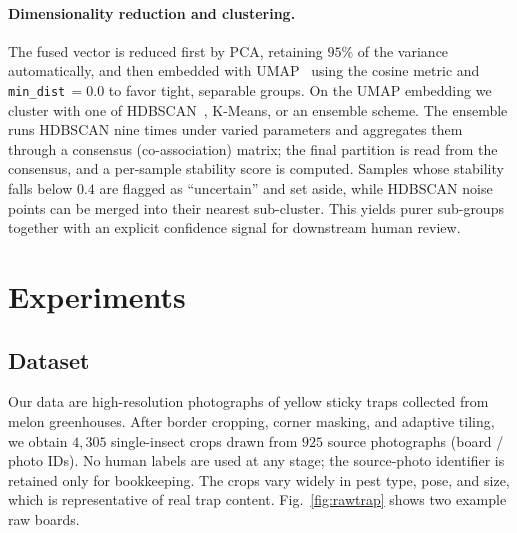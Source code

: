 \documentclass[10pt,a4paper,twocolumn]{article}
\begin{document}
\paragraph{Dimensionality reduction and clustering.}
The fused vector is reduced first by PCA, retaining $95\%$ of the variance automatically, and then embedded with UMAP~\cite{mcinnes2018umap} using the cosine metric and \texttt{min\_dist}\,$=\!0.0$ to favor tight, separable groups. On the UMAP embedding we cluster with one of HDBSCAN~\cite{campello2013hdbscan, mcinnes2017hdbscan}, K-Means, or an ensemble scheme. The ensemble runs HDBSCAN nine times under varied parameters and aggregates them through a consensus (co-association) matrix; the final partition is read from the consensus, and a per-sample stability score is computed. Samples whose stability falls below $0.4$ are flagged as ``uncertain'' and set aside, while HDBSCAN noise points can be merged into their nearest sub-cluster. This yields purer sub-groups together with an explicit confidence signal for downstream human review.

\section{Experiments}

\subsection{Dataset}
Our data are high-resolution photographs of yellow sticky traps collected from melon greenhouses. After border cropping, corner masking, and adaptive tiling, we obtain $4{,}305$ single-insect crops drawn from $925$ source photographs (board / photo IDs). No human labels are used at any stage; the source-photo identifier is retained only for bookkeeping. The crops vary widely in pest type, pose, and size, which is representative of real trap content. Fig.~\ref{fig:rawtrap} shows two example raw boards.
\end{document}
